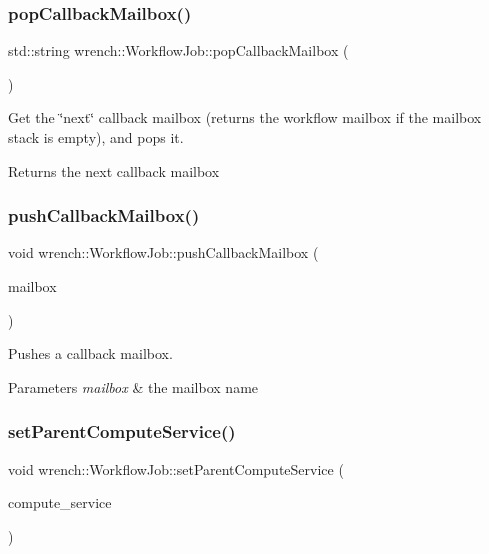 \subsubsection{\texorpdfstring{pop\+Callback\+Mailbox()}{popCallbackMailbox()}}
{\footnotesize\ttfamily std\+::string wrench\+::\+Workflow\+Job\+::pop\+Callback\+Mailbox (\begin{DoxyParamCaption}{ }\end{DoxyParamCaption})}



Get the \char`\"{}next\char`\"{} callback mailbox (returns the workflow mailbox if the mailbox stack is empty), and pops it. 

\begin{DoxyReturn}{Returns}
the next callback mailbox 
\end{DoxyReturn}
\mbox{\label{classwrench_1_1_workflow_job_a1f62a743be61fe41904c31ab8d6f9ce7}} 
\subsubsection{\texorpdfstring{push\+Callback\+Mailbox()}{pushCallbackMailbox()}}
{\footnotesize\ttfamily void wrench\+::\+Workflow\+Job\+::push\+Callback\+Mailbox (\begin{DoxyParamCaption}\item[{std\+::string}]{mailbox }\end{DoxyParamCaption})}



Pushes a callback mailbox. 


\begin{DoxyParams}{Parameters}
{\em mailbox} & the mailbox name \\
\hline
\end{DoxyParams}
\mbox{\label{classwrench_1_1_workflow_job_a96033386025a2f99584c73bc22c58f64}} 
\subsubsection{\texorpdfstring{set\+Parent\+Compute\+Service()}{setParentComputeService()}}
{\footnotesize\ttfamily void wrench\+::\+Workflow\+Job\+::set\+Parent\+Compute\+Service (\begin{DoxyParamCaption}\item[{\hyperlink{classwrench_1_1_compute_service}{Compute\+Service} $\ast$}]{compute\+\_\+service }\end{DoxyParamCaption})}



